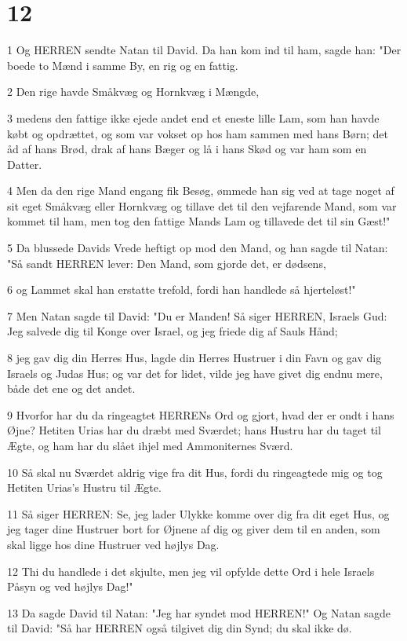 \chapter{12}

\par 1 Og HERREN sendte Natan til David. Da han kom ind til ham, sagde han: "Der boede to Mænd i samme By, en rig og en fattig.
\par 2 Den rige havde Småkvæg og Hornkvæg i Mængde,
\par 3 medens den fattige ikke ejede andet end et eneste lille Lam, som han havde købt og opdrættet, og som var vokset op hos ham sammen med hans Børn; det åd af hans Brød, drak af hans Bæger og lå i hans Skød og var ham som en Datter.
\par 4 Men da den rige Mand engang fik Besøg, ømmede han sig ved at tage noget af sit eget Småkvæg eller Hornkvæg og tillave det til den vejfarende Mand, som var kommet til ham, men tog den fattige Mands Lam og tillavede det til sin Gæst!"
\par 5 Da blussede Davids Vrede heftigt op mod den Mand, og han sagde til Natan: "Så sandt HERREN lever: Den Mand, som gjorde det, er dødsens,
\par 6 og Lammet skal han erstatte trefold, fordi han handlede så hjerteløst!"
\par 7 Men Natan sagde til David: "Du er Manden! Så siger HERREN, Israels Gud: Jeg salvede dig til Konge over Israel, og jeg friede dig af Sauls Hånd;
\par 8 jeg gav dig din Herres Hus, lagde din Herres Hustruer i din Favn og gav dig Israels og Judas Hus; og var det for lidet, vilde jeg have givet dig endnu mere, både det ene og det andet.
\par 9 Hvorfor har du da ringeagtet HERRENs Ord og gjort, hvad der er ondt i hans Øjne? Hetiten Urias har du dræbt med Sværdet; hans Hustru har du taget til Ægte, og ham har du slået ihjel med Ammoniternes Sværd.
\par 10 Så skal nu Sværdet aldrig vige fra dit Hus, fordi du ringeagtede mig og tog Hetiten Urias's Hustru til Ægte.
\par 11 Så siger HERREN: Se, jeg lader Ulykke komme over dig fra dit eget Hus, og jeg tager dine Hustruer bort for Øjnene af dig og giver dem til en anden, som skal ligge hos dine Hustruer ved højlys Dag.
\par 12 Thi du handlede i det skjulte, men jeg vil opfylde dette Ord i hele Israels Påsyn og ved højlys Dag!"
\par 13 Da sagde David til Natan: "Jeg har syndet mod HERREN!" Og Natan sagde til David: "Så har HERREN også tilgivet dig din Synd; du skal ikke dø.
